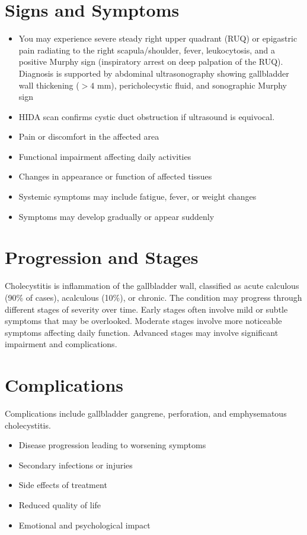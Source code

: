 \section{Signs and Symptoms}
\begin{itemize}[noitemsep]
  \item You may experience severe steady right upper quadrant (RUQ) or epigastric pain radiating to the right scapula/shoulder, fever, leukocytosis, and a positive Murphy sign (inspiratory arrest on deep palpation of the RUQ). Diagnosis is supported by abdominal ultrasonography showing gallbladder wall thickening ($>4$ mm), pericholecystic fluid, and sonographic Murphy sign
  \item HIDA scan confirms cystic duct obstruction if ultrasound is equivocal.
  \item Pain or discomfort in the affected area
  \item Functional impairment affecting daily activities
  \item Changes in appearance or function of affected tissues
  \item Systemic symptoms may include fatigue, fever, or weight changes
  \item Symptoms may develop gradually or appear suddenly
\end{itemize}
\section{Progression and Stages}
Cholecystitis is inflammation of the gallbladder wall, classified as acute calculous (90\% of cases), acalculous (10\%), or chronic. The condition may progress through different stages of severity over time. Early stages often involve mild or subtle symptoms that may be overlooked. Moderate stages involve more noticeable symptoms affecting daily function. Advanced stages may involve significant impairment and complications.
\section{Complications}
Complications include gallbladder gangrene, perforation, and emphysematous cholecystitis.

\begin{itemize}[noitemsep]
  \item Disease progression leading to worsening symptoms
  \item Secondary infections or injuries
  \item Side effects of treatment
  \item Reduced quality of life
  \item Emotional and psychological impact
\end{itemize}
